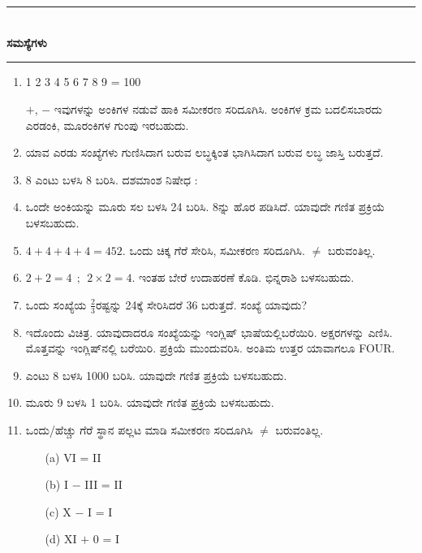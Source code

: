\chapter[ಅಧ್ಯಾಯ 8]{}\label{chap8}

\begin{center}
\rule{5cm}{1pt}\\[5pt]
{\Large\bfseries ಸಮಸ್ಯೆಗಳು}\\[3pt]
\rule{5cm}{1pt}
\end{center}

\begin{enumerate}
\renewcommand{\labelenumi}{\bf\theenumi.}
\itemsep=5pt

\item 1 2 3 4 5 6 7 8 9 = 100

$+$, $-$ ಇವುಗಳನ್ನು ಅಂಕಿಗಳ ನಡುವೆ ಹಾಕಿ ಸಮೀಕರಣ ಸರಿದೂಗಿಸಿ. ಅಂಕಿಗಳ ಕ್ರಮ ಬದಲಿಸಬಾರದು ಎರಡಂಕಿ, ಮೂರಂಕಿಗಳ ಗುಂಪು ಇರಬಹುದು. 

\item ಯಾವ ಎರಡು ಸಂಖ್ಯೆಗಳು ಗುಣಿಸಿದಾಗ ಬರುವ ಲಬ್ಧಕ್ಕಿಂತ ಭಾಗಿಸಿದಾಗ ಬರುವ ಲಬ್ಧ ಜಾಸ್ತಿ ಬರುತ್ತದೆ. 

\item 8 ಎಂಟು ಬಳಸಿ 8 ಬರಿಸಿ. ದಶಮಾಂಶ ನಿಷೇಧ :

\item ಒಂದೇ ಅಂಕಿಯನ್ನು ಮೂರು ಸಲ ಬಳಸಿ 24 ಬರಿಸಿ. 8ನ್ನು ಹೊರ ಪಡಿಸಿದೆ. ಯಾವುದೇ ಗಣಿತ ಪ್ರಕ್ರಿಯೆ ಬಳಸಬಹುದು. 

\item $4 + 4 + 4 + 4 = 452$. ಒಂದು ಚಿಕ್ಕ ಗೆರೆ ಸೇರಿಸಿ, ಸಮೀಕರಣ ಸರಿದೂಗಿಸಿ. $\neq$ ಬರುವಂತಿಲ್ಲ. 

\item $2 + 2 = 4 ~~;~~ 2\times 2 = 4$. ಇಂತಹ ಬೇರೆ ಉದಾಹರಣೆ ಕೊಡಿ. ಭಿನ್ನರಾಶಿ ಬಳಸಬಹುದು. 

\item ಒಂದು ಸಂಖ್ಯೆಯ $\frac{2}{3}$ರಷ್ಟನ್ನು 24ಕ್ಕೆ ಸೇರಿಸಿದರೆ 36 ಬರುತ್ತದೆ. ಸಂಖ್ಯೆ ಯಾವುದು? 

\item ಇದೊಂದು ವಿಚಿತ್ರ. ಯಾವುದಾದರೂ ಸಂಖ್ಯೆಯನ್ನು ಇಂಗ್ಲಿಷ್ ಭಾಷೆಯಲ್ಲಿ\break ಬರೆಯಿರಿ. ಅಕ್ಷರಗಳನ್ನು ಎಣಿಸಿ. ಮೊತ್ತವನ್ನು ಇಂಗ್ಲಿಷ್‌ನಲ್ಲಿ ಬರೆಯಿರಿ. ಪ್ರಕ್ರಿಯೆ ಮುಂದುವರಿಸಿ. ಅಂತಿಮ ಉತ್ತರ ಯಾವಾಗಲೂ FOUR.

\item ಎಂಟು 8 ಬಳಸಿ 1000 ಬರಿಸಿ. ಯಾವುದೇ ಗಣಿತ ಪ್ರಕ್ರಿಯೆ ಬಳಸಬಹುದು. 

\item ಮೂರು 9 ಬಳಸಿ 1  ಬರಿಸಿ. ಯಾವುದೇ ಗಣಿತ ಪ್ರಕ್ರಿಯೆ ಬಳಸಬಹುದು. 

\item ಒಂದು/ಹೆಚ್ಚು ಗೆರೆ ಸ್ಥಾನ ಪಲ್ಲಟ ಮಾಡಿ ಸಮೀಕರಣ ಸರಿದೂಗಿಸಿ $\neq$ ಬರುವಂತಿಲ್ಲ. 
\begin{itemize}
\item[(a)] VI = II
\item[(b)] I $-$ III = II
\item[(c)] X $-$ I = I
\item[(d)] XI $+$ 0 = I
\end{itemize}


\end{enumerate}
